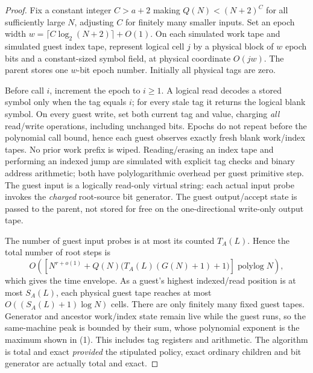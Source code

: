 \documentclass[11pt]{article}
\begin{document}
\begin{proof}
Fix a constant integer $C>a+2$ making $Q(N)<(N+2)^C$ for all sufficiently large $N$, adjusting $C$ for finitely many smaller inputs. Set an epoch width $w=\lceil C\log_2(N+2)\rceil+O(1)$. On each simulated work tape and simulated guest index tape, represent logical cell $j$ by a physical block of $w$ epoch bits and a constant-sized symbol field, at physical coordinate $O(jw)$. The parent stores one $w$-bit epoch number. Initially all physical tags are zero.

Before call $i$, increment the epoch to $i\ge1$. A logical read decodes a stored symbol only when the tag equals $i$; for every stale tag it returns the logical blank symbol. On every guest write, set both current tag and value, charging \emph{all} read/write operations, including unchanged bits. Epochs do not repeat before the polynomial call bound, hence each guest observes exactly fresh blank work/index tapes. No prior work prefix is wiped. Reading/erasing an index tape and performing an indexed jump are simulated with explicit tag checks and binary address arithmetic; both have polylogarithmic overhead per guest primitive step. The guest input is a logically read-only virtual string: each actual input probe invokes the \emph{charged} root-source bit generator. The guest output/accept state is passed to the parent, not stored for free on the one-directional write-only output tape.

The number of guest input probes is at most its counted $T_A(L)$. Hence the total number of root steps is
\[
O\!\left(
\left[N^{r+o(1)}
+Q(N)\bigl(T_A(L)(G(N)+1)+1\bigr)\right]\operatorname{polylog}N
\right),
\]
which gives the time envelope. As a guest's highest indexed/read position is at most $S_A(L)$, each physical guest tape reaches at most $O((S_A(L)+1)\log N)$ cells. There are only finitely many fixed guest tapes. Generator and ancestor work/index state remain live while the guest runs, so the same-machine peak is bounded by their sum, whose polynomial exponent is the maximum shown in (1). This includes tag registers and arithmetic. The algorithm is total and exact \emph{provided} the stipulated policy, exact ordinary children and bit generator are actually total and exact.
\end{proof}
\end{document}
